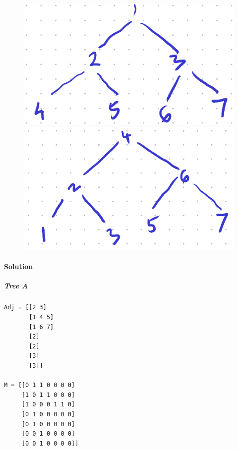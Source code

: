 \documentclass[11pt]{article}
\begin{document}
\begin{figure}[!h]
\centering
\begin{minipage}{0.4\textwidth}
\centering
\includegraphics[width=\linewidth]{./images/treeA.png}
\end{minipage}
\begin{minipage}{0.5\textwidth}
\centering
\includegraphics[width=\linewidth]{./images/treeB.png}
\end{minipage}
\end{figure}

\paragraph*{Solution}
\label{sec:orgb14f9e1}

\subparagraph*{Tree A}
\label{sec:org07614f1}
\begin{verbatim}
Adj = [[2 3] 
       [1 4 5] 
       [1 6 7] 
       [2]
       [2]
       [3]
       [3]]

M = [[0 1 1 0 0 0 0]
     [1 0 1 1 0 0 0]
     [1 0 0 0 1 1 0]
     [0 1 0 0 0 0 0]
     [0 1 0 0 0 0 0]
     [0 0 1 0 0 0 0]
     [0 0 1 0 0 0 0]]
\end{verbatim}
\end{document}
